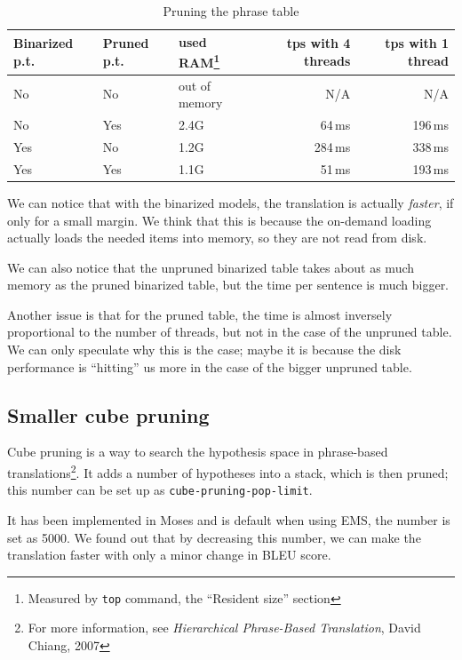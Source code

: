 \begin{table}[h]
\begin{center}
\begin{tabular}{|l|l|l|r|r|}
    \hline
    \textbf{Binarized p.t.} & \textbf{Pruned p.t.} & \textbf{used RAM}\footnote{Measured by \texttt{top} command, the ``Resident size'' section} & \textbf{tps with 4 threads} & \textbf{tps with 1 thread} \\ \hline
    No & No & out of memory & N/A&N/A \\ \hline
    No & Yes & 2.4G & 64\,ms& 196\,ms\\ \hline
    Yes & No & 1.2G & 284\,ms& 338\,ms\\ \hline
   
    Yes & Yes & 1.1G & 51\,ms& 193\,ms\\ \hline
    
\end{tabular}
\end{center}

\caption{Pruning the phrase table}\label{moses:binarizing}
\end{table}

We can notice that with the binarized models, the translation is actually \emph{faster}, if only for a small margin. We think that this is because the on-demand loading actually loads the needed items into memory, so they are not read from disk.

We can also notice that the unpruned binarized table takes about as much memory as the pruned binarized table, but the time per sentence is much bigger.

Another issue is that for the pruned table, the time is almost inversely proportional to the number of threads, but not in the case of the unpruned table. We can only speculate why this is the case; maybe it is because the disk performance is ``hitting'' us more in the case of the bigger unpruned table.

\subsection{Smaller cube pruning}
Cube pruning is a way to search the hypothesis space in phrase-based translations\footnote{For more information, see \emph{Hierarchical Phrase-Based Translation}, David Chiang, 2007}. It adds a number of  hypotheses into a stack, which is then pruned; this number can be set up as \texttt{cube-pruning-pop-limit}.

It has been implemented in Moses and is default when using EMS, the number is set as 5000. We found out that by decreasing this number, we can make the translation faster with only a minor change in BLEU score.

